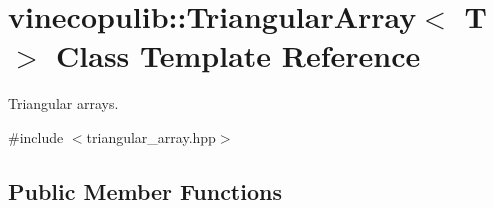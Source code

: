 \hypertarget{classvinecopulib_1_1_triangular_array}{}\section{vinecopulib\+:\+:Triangular\+Array$<$ T $>$ Class Template Reference}
\label{classvinecopulib_1_1_triangular_array}


Triangular arrays.  




{\ttfamily \#include $<$triangular\+\_\+array.\+hpp$>$}

\subsection*{Public Member Functions}
